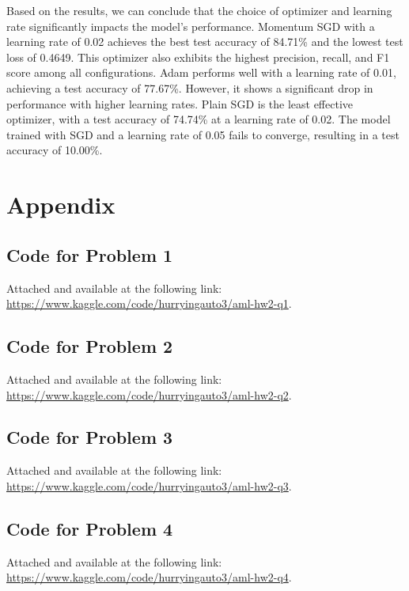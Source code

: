 \documentclass{article}
\begin{document}
Based on the results, we can conclude that the choice of optimizer and learning rate significantly impacts the model's performance. Momentum SGD with a learning rate of 0.02 achieves the best test accuracy of 84.71\% and the lowest test loss of 0.4649. This optimizer also exhibits the highest precision, recall, and F1 score among all configurations. Adam performs well with a learning rate of 0.01, achieving a test accuracy of 77.67\%. However, it shows a significant drop in performance with higher learning rates. Plain SGD is the least effective optimizer, with a test accuracy of 74.74\% at a learning rate of 0.02. The model trained with SGD and a learning rate of 0.05 fails to converge, resulting in a test accuracy of 10.00\%. 



\newpage
\section*{Appendix}
\subsection*{Code for Problem 1}
Attached and available at the following link: \url{https://www.kaggle.com/code/hurryingauto3/aml-hw2-q1}.

\subsection*{Code for Problem 2}
Attached and available at the following link: \url{https://www.kaggle.com/code/hurryingauto3/aml-hw2-q2}.

\subsection*{Code for Problem 3}
Attached and available at the following link: \url{https://www.kaggle.com/code/hurryingauto3/aml-hw2-q3}.

\subsection*{Code for Problem 4}
Attached and available at the following link: \url{https://www.kaggle.com/code/hurryingauto3/aml-hw2-q4}.





\end{document}
